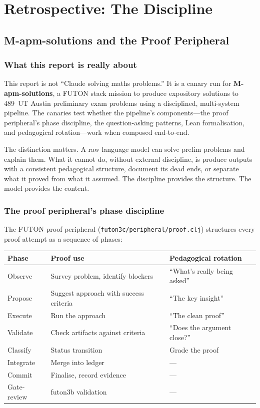 \documentclass[12pt,oneside]{book}
\theoremstyle{plain}
\theoremstyle{definition}
\theoremstyle{remark}
\begin{document}
\part{Retrospective: The Discipline}

\chapter{M-apm-solutions and the Proof Peripheral}

\section{What this report is really about}

This report is not ``Claude solving maths problems.'' It is a canary
run for \textbf{M-apm-solutions}, a FUTON stack mission to produce
expository solutions to 489~UT Austin preliminary exam problems using a
disciplined, multi-system pipeline. The canaries test whether the
pipeline's components---the proof peripheral's phase discipline, the
question-asking patterns, Lean formalisation, and pedagogical
rotation---work when composed end-to-end.

The distinction matters. A raw language model can solve prelim problems
and explain them. What it cannot do, without external discipline, is
produce outputs with a consistent pedagogical structure, document its
dead ends, or separate what it proved from what it assumed. The
discipline provides the structure. The model provides the content.

\section{The proof peripheral's phase discipline}

The FUTON proof peripheral (\texttt{futon3c/peripheral/proof.clj})
structures every proof attempt as a sequence of phases:

\begin{center}
\begin{tabular}{lll}
\toprule
\textbf{Phase} & \textbf{Proof use} & \textbf{Pedagogical rotation} \\
\midrule
Observe  & Survey problem, identify blockers & ``What's really being asked'' \\
Propose  & Suggest approach with success criteria & ``The key insight'' \\
Execute  & Run the approach & ``The clean proof'' \\
Validate & Check artifacts against criteria & ``Does the argument close?'' \\
Classify & Status transition & Grade the proof \\
Integrate & Merge into ledger & --- \\
Commit   & Finalise, record evidence & --- \\
Gate-review & futon3b validation & --- \\
\bottomrule
\end{tabular}
\end{center}
\end{document}
